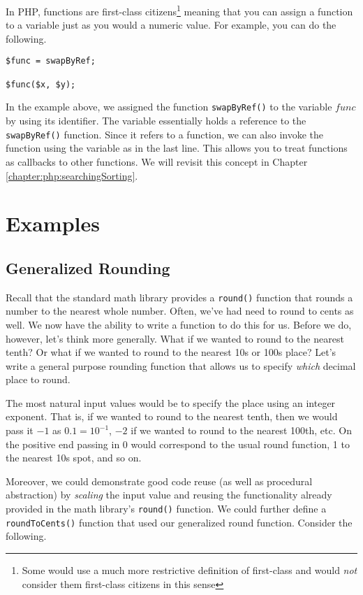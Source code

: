 In PHP, functions are first-class citizens\footnote{Some would use
a much more restrictive definition of first-class and would \emph{not}
consider them first-class citizens in this sense} meaning that you
can assign a function to a variable just as you would a numeric value.
For example, you can do the following.

\begin{verbatim}
$func = swapByRef;

$func($x, $y);
\end{verbatim}

In the example above, we assigned the function \texttt{swapByRef()}
to the variable \texttt{$func$} by using its identifier.  The
variable essentially holds a reference to the \texttt{swapByRef()} 
function.  Since it refers to a function, we can also invoke the function
using the variable as in the last line.  This allows you to treat functions
as callbacks to other functions.  We will revisit this concept in Chapter
\ref{chapter:php:searchingSorting}.

\section{Examples}

\subsection{Generalized Rounding}

Recall that the standard math library provides a \texttt{round()}
function that rounds a number to the nearest whole number.  
Often, we've had need to round to cents as well.  We now have 
the ability to write a function to do this for us.  Before we do, 
however, let's think more generally.  What if we wanted to round 
to the nearest tenth?  Or what if we wanted to round to the nearest 
10s or 100s place?  Let's write a general purpose rounding function 
that allows us to specify \emph{which} decimal place to round.  

The most natural input values would be to specify the place using
an integer exponent.  That is, if we wanted to round to the nearest
tenth, then we would pass it $-1$ as $0.1 = 10^{-1}$, $-2$ if we wanted
to round to the nearest 100th, etc.  On the positive end passing in 0
would correspond to the usual round function, 1 to the nearest 10s 
spot, and so on.  

Moreover, we could demonstrate good code reuse (as well 
as procedural abstraction) by \emph{scaling} the input value 
and reusing the functionality already provided in the math 
library's \texttt{round()} function.  We could further 
define a \texttt{roundToCents()} function that used 
our generalized round function.  Consider the following.

